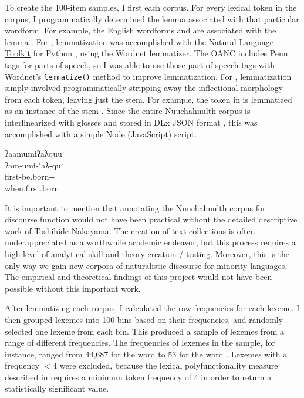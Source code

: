 To create the 100-item samples, I first  each corpus. For every lexical token in the corpus, I programmatically determined the lemma associated with that particular wordform. For example, the English wordforms  and  are associated with the lemma . For , lemmatization was accomplished with the \href{http://www.nltk.org/}{Natural Language Toolkit} for Python \parencite{BirdKleinLoper2009}, using the Wordnet lemmatizer. The OANC includes Penn tags for parts of speech, so I was able to use those part-of-speech tags with Wordnet's \texttt{lemmatize()} method to improve lemmatization. For , lemmatization simply involved programmatically stripping away the inflectional morphology from each token, leaving just the stem. For example, the token in  is lemmatized as an instance of the stem  . Since the entire Nuuchahnulth corpus is interlinearized with glosses and stored in DLx JSON format \parencite{Hieber2021a}, this was accomplished with a simple Node (JavaScript) script.

\clearpage

\begin{exe}
  \ex\label{ex:3.1}
  \vfix
  \gllll ʔaamumɬʔaƛquu\\
         ʔam‑umɬ‑ʼaƛ‑quː\\
         first‑be.born‑‑\\
         when.first.born\\
         \vfix
\end{exe}

\noindent It is important to mention that annotating the Nuuchahnulth corpus for discourse function would not have been practical without the detailed descriptive work of Toshihide Nakayama. The creation of text collections is often underappreciated as a worthwhile academic endeavor, but this process requires a high level of analytical skill and theory creation / testing. Moreover, this is the only way we gain new corpora of naturalistic discourse for minority languages. The empirical and theoretical findings of this project would not have been possible without this important work.

After lemmatizing each corpus, I calculated the raw frequencies for each lexeme. I then grouped lexemes into 100 bins based on their frequencies, and randomly selected one lexeme from each bin. This produced a sample of lexemes from a range of different frequencies. The frequencies of lexemes in the  sample, for instance, ranged from 44,687 for the word  to 53 for the word . Lexemes with a frequency $<$4 were excluded, because the lexical polyfunctionality measure described in  requires a minimum token frequency of 4 in order to return a statistically significant value.

